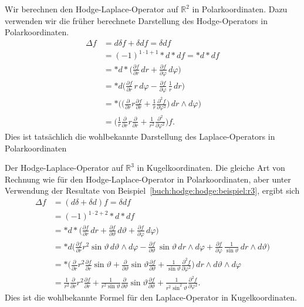 \begin{beispiel}
Wir berechnen den Hodge-Laplace-Operator auf $\mathbb{R}^2$ in
Polarkoordinaten.
%
Dazu verwenden wir die früher berechnete Darstellung des Hodge-Operators
in Polarkoordinaten.
\begin{align*}
\Delta f
&=
d\delta f
+
\delta d f
=
\delta d f
\\
&=
(-1)^{1\cdot 1+1}
{\ast}d{\ast}d f
=
{\ast}d{\ast}d f
\\
&=
{\ast}d{\ast}
\biggl(
\frac{\partial f}{\partial r}\,dr
+
\frac{\partial f}{\partial \varphi}\,d\varphi
\biggr)
\\
&=
{\ast}d\biggl(
\frac{\partial f}{\partial r}\,r\,d\varphi
-
\frac{\partial f}{\partial \varphi}\,\frac{1}{r}\,dr
\biggr)
\\
&=
{\ast}
\biggl(
\biggl(
\frac{\partial }{\partial r} r \frac{\partial f}{\partial r}
+
\frac{1}{r}
\frac{\partial^2 f}{\partial\varphi^2}
\biggr)
\,dr\wedge d\varphi
\biggr)
\\
&=
\biggl(
\frac{1}{r}
\frac{\partial}{\partial r} 
r
\frac{\partial}{\partial r}
+
\frac{1}{r^2}
\frac{\partial^2}{\partial \varphi^2}
\biggr)
f.
\end{align*}
Dies ist tatsächlich die wohlbekannte Darstellung des
Laplace-Operators in Polarkoordinaten
\end{beispiel}

\begin{beispiel}
Der Hodge-Laplace-Operator auf $\mathbb{R}^3$ in
Kugelkoordinaten.
%
Die gleiche Art von Rechnung wie für den Hodge-Laplace-Operator in
Polarkoordinaten, aber unter Verwendung der Resultate von
Beispiel~\ref{buch:hodge:hodge:beispiel:r3}, ergibt sich
\begin{align*}
\Delta f
&=
(d\delta + \delta d) f
=
\delta d f
\\
&=
(-1)^{1\cdot 2+2}
{\ast}d{\ast}df
\\
&=
{\ast}d{\ast}\biggl(
\frac{\partial f}{\partial r}\,dr
+
\frac{\partial f}{\partial\vartheta}\,d\vartheta
+
\frac{\partial f}{\partial\varphi}\,d\varphi
\biggr)
\\
&=
{\ast}d\biggl(
\frac{\partial f}{\partial r} r^2\sin\vartheta \, d\vartheta\wedge d\varphi
-
\frac{\partial f}{\partial\vartheta}\,\sin\vartheta\,dr\wedge d\varphi
+
\frac{\partial f}{\partial\varphi}\,\frac{1}{\sin\vartheta}\,dr\wedge d\vartheta
\biggr)
\\
&=
{\ast}
\biggl(
\frac{\partial}{\partial r}r^2\frac{\partial f}{\partial r}
\sin\vartheta
+
\frac{\partial}{\partial \vartheta}
\sin\vartheta
\frac{\partial f}{\partial \vartheta}
+
\frac{1}{\sin\vartheta}
\frac{\partial^2 f}{\partial\varphi^2}
\biggr)
\,dr\wedge d\vartheta\wedge d\varphi
\\
&=
\frac{1}{r^2}
\frac{\partial}{\partial r}r^2\frac{\partial f}{\partial r}
+
\frac{1}{r^2\sin\vartheta}
\frac{\partial}{\partial \vartheta}
\sin\vartheta
\frac{\partial f}{\partial \vartheta}
+
\frac{1}{r^2\sin^2\vartheta}
\frac{\partial^2 f}{\partial \varphi^2}.
\end{align*}
Dies ist die wohlbekannte Formel für den Laplace-Operator in 
Kugelkoordinaten.
\end{beispiel}


